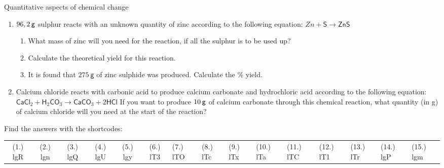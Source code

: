 \begin{eocexercises}{Quantitative aspects of chemical change}
\begin{enumerate}[noitemsep, label=\textbf{\arabic*}. ]
\begin{enumerate}[noitemsep, label=\textbf{\alph*}. ]
\end{enumerate}
                \label{m38717*uid64}\item $96,2\phantom{\rule{2pt}{0ex}}\mathsf{g}$ sulphur reacts with an unknown quantity of zinc according to the following equation:
$Zn+\mathsf{S}\to \mathsf{ZnS}$\label{m38717*id280179}\begin{enumerate}[noitemsep, label=\textbf{\alph*}. ] 
            \label{m38717*uid65}\item What mass of zinc will you need for the reaction, if all the sulphur is to be used up?
\label{m38717*uid66}\item Calculate the theoretical yield for this reaction.
\item It is found that $275~\mathsf{g}$ of zinc sulphide was produced. Calculate the \% yield.
\end{enumerate}
                \label{m38717*uid67}\item Calcium chloride reacts with carbonic acid to produce calcium carbonate and hydrochloric acid according to the following equation:
${\mathsf{CaCl}}_{2}+{\mathsf{H}}_{2}{\mathsf{CO}}_{3}\to {\mathsf{CaCO}}_{3}+2\mathsf{HCl}$
If you want to produce $10\phantom{\rule{2pt}{0ex}}\mathsf{g}$ of calcium carbonate through this chemical reaction, what quantity (in g) of calcium chloride will you need at the start of the reaction?\newline
                \end{enumerate}
  \label{m38712**end}
  \label{0044f0dab6cfd2ca2bac282dc4009886**end}
\par {} Find the answers with the shortcodes:
 \par \begin{tabular}[h]{cccccc}
 (1.) lgR  &  (2.) lgn  &  (3.) lgQ  &  (4.) lgU  &  (5.) lgy  &  (6.) lT3  &  (7.) lTO  &  (8.) lTc  &  (9.) lTx  &  (10.) lTa  &  (11.) lTC  &  (12.) lT1  &  (13.) lTr  &  (14.) lgP  &  (15.) lgm  & \end{tabular}
\end{eocexercises}
